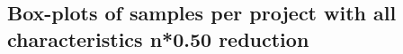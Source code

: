 \begin{appendices}
\chapter{Box-plots of samples per project with all characteristics n*0.50 reduction}
\label{ap:full_50}
\begin{figure}[h]
    \centering
    \qquad
\end{figure}


\end{appendices}
